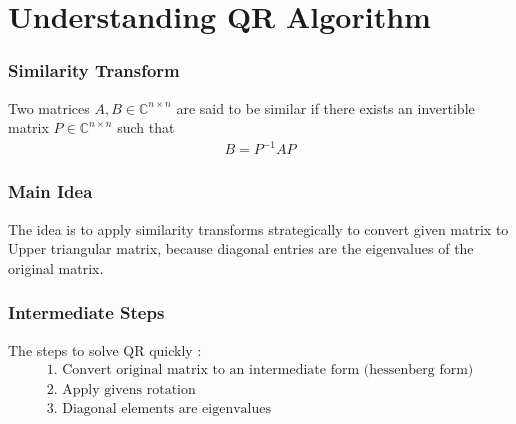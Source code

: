 \documentclass{beamer}
\theoremstyle{remark}
\numberwithin{equation}{section}
\begin{document}
\section{Understanding QR Algorithm}
\begin{frame}
\frametitle{Similarity Transform}
Two matrices $A, B \in \mathbb{C}^{n \times n}$ are said to be similar if there exists an invertible matrix $P \in \mathbb{C}^{n \times n}$ such that
    \begin{align}
        B = P^{-1}AP
    \end{align}
\end{frame}
\begin{frame}
\frametitle{Main Idea}
The idea is to apply similarity transforms strategically to convert given matrix to Upper 
triangular matrix, because diagonal entries are the eigenvalues of the original matrix.
\end{frame}
\begin{frame}
  \frametitle{Intermediate Steps}
The steps to solve QR quickly :
\begin{align}
  \text{1. Convert original matrix to an intermediate form (hessenberg form)}\\
  \text{2. Apply givens rotation}\\
  \text{3. Diagonal elements are eigenvalues}\\
\end{align}
\end{frame}
\end{document}
